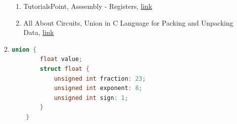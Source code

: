 \documentclass[12pt]{article}
\begin{document}
\begin{enumerate}[1.]
    \bigskip

    \begin{enumerate}[1)]
        \item TutorialsPoint, Asssembly - Registers, \href{https://www.tutorialspoint.com/assembly_programming/assembly_registers.htm}{link}
        \item All About Circuits, Union in C Language for Packing and Unpacking Data, \href{https://www.allaboutcircuits.com/technical-articles/union-in-c-language-for-packing-and-unpacking-data/}{link}
    \end{enumerate}

    \item

\begin{lstlisting}[language=c]
    union {
        float value;
        struct float {
            unsigned int fraction: 23;
            unsigned int exponent: 8;
            unsigned int sign: 1;
        }
    }
\end{lstlisting}

\end{enumerate}
\end{document}
